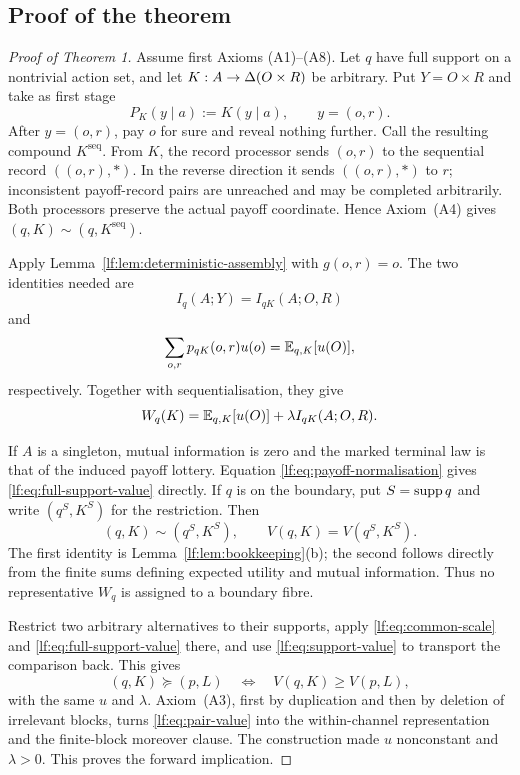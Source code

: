 \subsection{Proof of the theorem}

\begin{proof}[Proof of Theorem 1]
Assume first Axioms \textup{(A1)--(A8)}.  Let $q$ have full support on a
nontrivial action set, and let $K:A\to\Delta(O\times R)$ be arbitrary.  Put
$Y=O\times R$ and take as first stage
\[
P_K(y\mid a):=K(y\mid a),
\qquad y=(o,r).
\]
After $y=(o,r)$, pay $o$ for sure and reveal nothing further.  Call the
resulting compound $K^{\mathrm{seq}}$.  From $K$, the record processor sends
$(o,r)$ to the sequential record $((o,r),\ast)$.  In the reverse direction it
sends $((o,r),\ast)$ to $r$; inconsistent payoff-record pairs are unreached and
may be completed arbitrarily.  Both processors preserve the actual payoff
coordinate.  Hence Axiom~\textup{(A4)} gives
$(q,K)\sim(q,K^{\mathrm{seq}})$.

\begin{samepage}
Apply Lemma~\ref{lf:lem:deterministic-assembly} with $g(o,r)=o$.  The two
identities needed are
\[
I_q(A;Y)=I_{qK}(A;O,R)
\]
and
\[
\sum_{o,r}p_{qK}(o,r)u(o)=\mathbb E_{q,K}[u(O)],
\]
respectively.  Together with sequentialisation, they give
\begin{equation}
W_q(K)=\mathbb E_{q,K}[u(O)]+\lambda I_{qK}(A;O,R).
\label{lf:eq:full-support-value}
\end{equation}
\end{samepage}

If $A$ is a singleton, mutual information is zero and the marked terminal law
is that of the induced payoff lottery.  Equation
\eqref{lf:eq:payoff-normalisation} gives
\eqref{lf:eq:full-support-value} directly.  If $q$ is on the boundary, put
$S=\operatorname{supp} q$ and write $(q^S,K^S)$ for the restriction.  Then
\begin{equation}
(q,K)\sim(q^S,K^S),
\qquad
V(q,K)=V(q^S,K^S).
\label{lf:eq:support-value}
\end{equation}
The first identity is Lemma~\ref{lf:lem:bookkeeping}\textup{(b)}; the second
follows directly from the finite sums defining expected utility and mutual
information.  Thus no representative $W_q$ is assigned to a boundary fibre.

Restrict two arbitrary alternatives to their supports, apply
\eqref{lf:eq:common-scale} and \eqref{lf:eq:full-support-value} there, and use
\eqref{lf:eq:support-value} to transport the comparison back.  This gives
\begin{equation}
(q,K)\succeq(p,L)
\quad\Longleftrightarrow\quad
V(q,K)\ge V(p,L),
\label{lf:eq:pair-value}
\end{equation}
with the same $u$ and $\lambda$.  Axiom~\textup{(A3)}, first by duplication and
then by deletion of irrelevant blocks, turns \eqref{lf:eq:pair-value} into the
within-channel representation and the finite-block moreover clause.  The
construction made $u$ nonconstant and $\lambda>0$.  This proves the forward
implication.


\end{proof}
